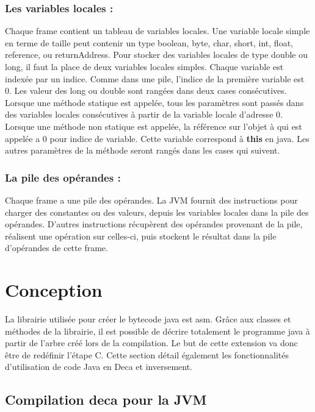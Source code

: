 \documentclass[12pt, a4paper, one side]{article}
\begin{document}
    \subsubsection{Les variables locales :}
    Chaque frame contient un tableau de variables locales. Une variable locale   simple en terme de taille peut contenir un type boolean, byte, char, short, int, float, reference, ou returnAddress. Pour stocker des variables locales de type double ou long, il faut la place de deux variables locales simples.
    Chaque variable est indexée par un indice. Comme dans une pile, l'indice de la première variable est 0. Les valeur des long ou double sont rangées dans deux cases consécutives.
    Lorsque une méthode statique est appelée, tous les paramètres sont passés dans des variables locales consécutives à partir de la variable locale d'adresse 0.
    Lorsque une méthode non statique est appelée, la référence sur l'objet à qui  est appelée a 0 pour indice de variable. Cette variable correspond à \textbf{this} en java. Les autres paramètres de la méthode seront rangés dans les cases qui suivent.

    \subsubsection{La pile des opérandes :} Chaque frame a une pile des opérandes.
    La JVM fournit des instructions pour charger des constantes ou des valeurs, depuis les variables locales dans la pile des opérandes.
    D'autres instructions récupèrent des opérandes provenant de la pile, réalisent une opération sur celles-ci, puis stockent le résultat dans la pile d'opérandes de cette frame.

    \newpage
    \section{Conception}

    La librairie utilisée pour créer le bytecode java est asm. Grâce aux classes
    et méthodes de la librairie, il est possible de décrire totalement le programme
    java à partir de l'arbre créé lors de la compilation. Le but de cette extension
    va donc être de redéfinir l'étape C.
    Cette section détail également les fonctionnalités d'utilisation de code Java en Deca et inversement.

    \subsection{Compilation deca pour la JVM}
\end{document}
